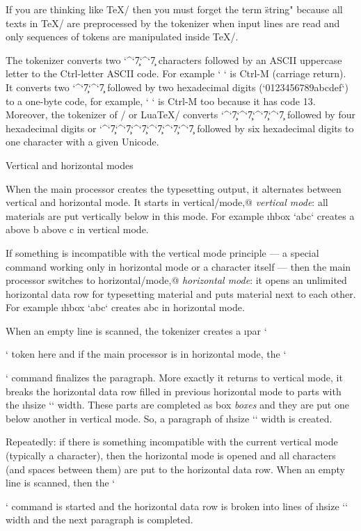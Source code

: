 If you are thinking like \TeX/ then you must forget the term \"string"
because all texts in \TeX/ are preprocessed by the tokenizer when input lines are
read and only sequences of tokens are manipulated inside \TeX/.

The tokenizer converts two `^`\c7`^`\c7 characters followed by an ASCII uppercase
letter to the Ctrl-letter ASCII code. For example `^^M` is Ctrl-M (carriage
return). It converts two `^`\c7`^`\c7 followed by two hexadecimal digits 
(`0123456789abcdef`) to a one-byte code, for example, `^^0d` is Ctrl-M too 
because it has code 13. Moreover, the tokenizer of \XeTeX/ or Lua\TeX/ converts
`^`\c7`^`\c7`^`\c7`^`\c7 followed by four hexadecimal digits or 
`^`\c7`^`\c7`^`\c7`^`\c7`^`\c7`^`\c7 followed by six hexadecimal digits to one
character with a given Unicode.


\sec Vertical and horizontal modes

When the main processor creates the typesetting output, it alternates
between vertical and horizontal mode. It starts in \ii vertical/mode,@ {\em vertical mode}: all
materials are put vertically below in this mode. For example
\i hbox `\hbox{a}\hbox{b}\hbox{c}` creates a above b above c in vertical mode.

If something is incompatible with the vertical mode principle --- a special
command working only in horizontal mode or a character itself ---
then the main processor switches to \ii horizontal/mode,@ {\em horizontal mode}: it opens 
an unlimited horizontal data row for
typesetting material and puts material next to each other. For example
\i hbox `\hbox{a}\hbox{b}\hbox{c}` creates abc in horizontal mode.

When an empty line is scanned, the tokenizer creates a \i par `\par` token here and
if the main processor is in horizontal mode, the `\par` command finalizes the
paragraph. More exactly it returns to vertical mode, 
it breaks the horizontal data row filled in previous horizontal mode 
to parts with the \i hsize `\hsize` width. These parts are completed as 
\ii box {\em boxes} and they are put one below another in vertical mode. So, a
paragraph of \i hsize `\hsize` width is created.

Repeatedly: if there is something incompatible with the current vertical mode
(typically a character), then the horizontal mode is opened and all characters
(and spaces between them) are put to the horizontal data row. When an empty line
is scanned, then the `\par` command is started and the horizontal 
data row is broken into lines of \i hsize `\hsize` width and the next paragraph 
is completed.

